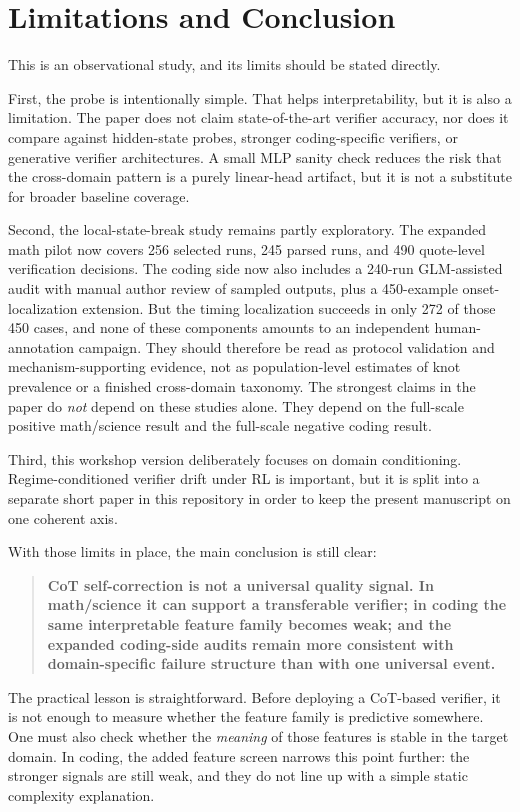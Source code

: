 \documentclass[10pt]{article}
\begin{document}
\section{Limitations and Conclusion}

This is an observational study, and its limits should be stated directly.

First, the probe is intentionally simple. That helps interpretability, but it is also a limitation. The paper does not claim state-of-the-art verifier accuracy, nor does it compare against hidden-state probes, stronger coding-specific verifiers, or generative verifier architectures. A small MLP sanity check reduces the risk that the cross-domain pattern is a purely linear-head artifact, but it is not a substitute for broader baseline coverage.

Second, the local-state-break study remains partly exploratory. The expanded math pilot now covers 256 selected runs, 245 parsed runs, and 490 quote-level verification decisions. The coding side now also includes a 240-run GLM-assisted audit with manual author review of sampled outputs, plus a 450-example onset-localization extension. But the timing localization succeeds in only 272 of those 450 cases, and none of these components amounts to an independent human-annotation campaign. They should therefore be read as protocol validation and mechanism-supporting evidence, not as population-level estimates of knot prevalence or a finished cross-domain taxonomy. The strongest claims in the paper do \emph{not} depend on these studies alone. They depend on the full-scale positive math/science result and the full-scale negative coding result.

Third, this workshop version deliberately focuses on domain conditioning. Regime-conditioned verifier drift under RL is important, but it is split into a separate short paper in this repository in order to keep the present manuscript on one coherent axis.

With those limits in place, the main conclusion is still clear:
\begin{quote}
\textbf{CoT self-correction is not a universal quality signal. In math/science it can support a transferable verifier; in coding the same interpretable feature family becomes weak; and the expanded coding-side audits remain more consistent with domain-specific failure structure than with one universal event.}
\end{quote}

The practical lesson is straightforward. Before deploying a CoT-based verifier, it is not enough to measure whether the feature family is predictive somewhere. One must also check whether the \emph{meaning} of those features is stable in the target domain. In coding, the added feature screen narrows this point further: the stronger signals are still weak, and they do not line up with a simple static complexity explanation.
\end{document}
